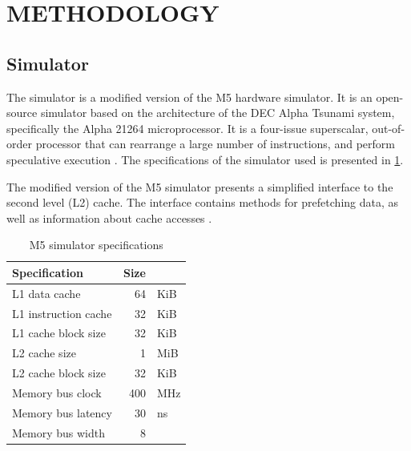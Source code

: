 \documentclass[conference]{IEEEtran}
\begin{document}
\section{METHODOLOGY}
\subsection{Simulator}
The simulator is a modified version of the M5 hardware simulator. It is an open-source simulator based on the architecture of the DEC Alpha Tsunami system, specifically the Alpha 21264 microprocessor. It is a four-issue superscalar, out-of-order processor that can rearrange a large number of instructions, and perform speculative execution \cite{alph21264}. The specifications of the simulator used is presented in \cref{tab:m5spec}. 

The modified version of the M5 simulator presents a simplified interface to the second level (L2) cache. The interface contains methods for prefetching data, as well as information about cache accesses \cite{m5doc}. 

\begin{table}[H]
    \centering
    \begin{tabular}{l | r l}
        Specification        & Size &                   \\
        \hline
        L1 data cache        & 64   & \hspace{-4mm} KiB \\
        L1 instruction cache & 32   & \hspace{-4mm} KiB \\
        L1 cache block size  & 32   & \hspace{-4mm} KiB \\
        L2 cache size        & 1    & \hspace{-4mm} MiB \\
        L2 cache block size  & 32   & \hspace{-4mm} KiB \\
        Memory bus clock     & 400  & \hspace{-4mm} MHz \\
        Memory bus latency   & 30   & \hspace{-4mm} ns  \\
        Memory bus width     & 8    & \hspace{-4mm}     \\
    \end{tabular}
    \vspace{5mm}
    \caption{M5 simulator specifications}
    \label{tab:m5spec}
    \vspace{-5mm}
\end{table}
\end{document}
